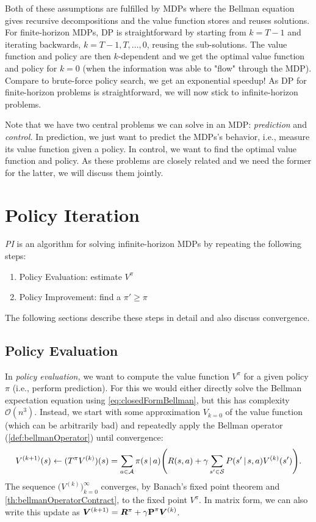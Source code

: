 	Both of these assumptions are fulfilled by \acp{MDP} where the Bellman equation gives recursive decompositions and the value function stores and reuses solutions. For finite-horizon \acp{MDP}, \ac{DP} is straightforward by starting from \(k = T - 1\) and iterating backwards, \(k = T - 1, T, \dots, 0\), reusing the sub-solutions. The value function and policy are then \(k\)-dependent and we get the optimal value function and policy for \(k = 0\) (when the information was able to "flow" through the \ac{MDP}). Compare to brute-force policy search, we get an exponential speedup! As \ac{DP} for finite-horizon problems is straightforward, we will now stick to infinite-horizon problems.

	Note that we have two central problems we can solve in an \ac{MDP}: \emph{prediction} and \emph{control.} In prediction, we just want to predict the \acp{MDP}'s behavior, i.e., measure its value function given a policy. In control, we want to find the optimal value function and policy. As these problems are closely related and we need the former for the latter, we will discuss them jointly.

	\section{Policy Iteration}
		\emph{\ac{PI}} is an algorithm for solving infinite-horizon \acp{MDP} by repeating the following steps:
		\begin{enumerate}
			\item Policy Evaluation: estimate \(V^\pi\)
			\item Policy Improvement: find a \(\pi' \geq \pi\)
		\end{enumerate}
		The following sections describe these steps in detail and also discuss convergence.

		\subsection{Policy Evaluation}
			In \emph{policy evaluation,} we want to compute the value function \(V^\pi\) for a given policy \(\pi\) (i.e., perform prediction). For this we would either directly solve the Bellman expectation equation using \eqref{eq:closedFormBellman}, but this has complexity \(\mathcal{O}(n^3)\). Instead, we start with some approximation \( V_{k = 0} \) of the value function (which can be arbitrarily bad) and repeatedly apply the Bellman operator (\autoref{def:bellmanOperator}) until convergence:
			\begin{equation}
				V^{(k + 1)}(s)
				\gets (T^\pi V^{(k)})(s)
				= \sum_{a \in \mathcal{A}} \pi(s \,\vert\, a) \Biggl( R(s, a) + \gamma \sum_{s' \in \mathcal{S}} P(s' \,\vert\, s, a) V^{(k)}(s') \Biggr).
			\end{equation}
			The sequence \(\bigl(V^{(k)}\bigr)_{k = 0}^{\infty}\) converges, by Banach's fixed point theorem and \autoref{th:bellmanOperatorContract}, to the fixed point \(V^\pi\). In matrix form, we can also write this update as \( \bm{V}^{(k + 1)} = \bm{R}^\pi + \gamma \bm{\mathrm{P}}^\pi \bm{V}^{(k)} \).

